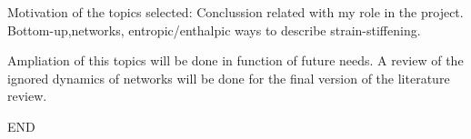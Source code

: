Motivation of the topics selected:
Conclussion related with my role in the project. Bottom-up,networks,
entropic/enthalpic ways to describe strain-stiffening.

Ampliation of this topics will be done in function of future needs. A review of
the ignored dynamics of networks will be done for the final version of the
literature review.

END






